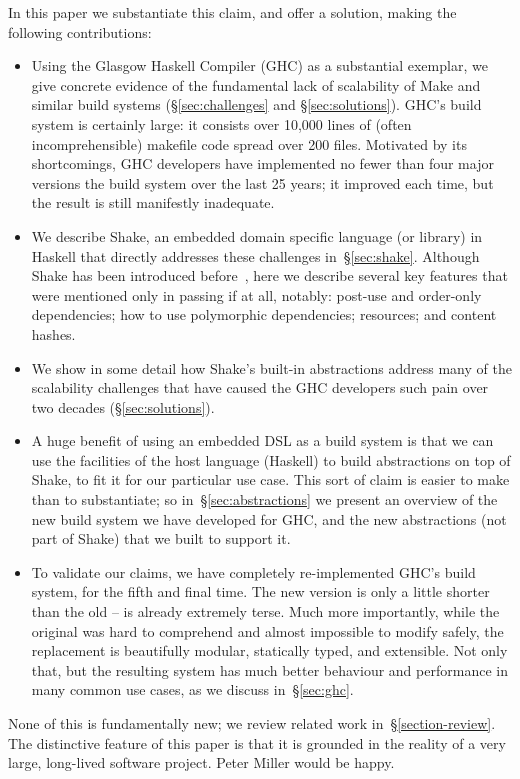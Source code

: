In this paper we substantiate this claim, and offer a solution,
making the following contributions:
\begin{itemize}
\item Using the Glasgow Haskell Compiler (GHC) as a substantial exemplar,
we give concrete evidence of the fundamental lack of scalability of
Make and similar build systems (\S\ref{sec:challenges} and
\S\ref{sec:solutions}).  GHC's build system is certainly large: it
consists over 10,000 lines of (often incomprehensible) makefile code
spread over 200 files.  Motivated by its shortcomings, GHC developers have
implemented no fewer than four major versions the build system over the
last 25 years; it improved each time, but the result is still manifestly inadequate.

\item We describe Shake, an embedded domain specific language (or library)
in Haskell that directly addresses these challenges
in~\S\ref{sec:shake}.
Although Shake has been introduced before~\cite{shake}, here we describe
several key features that were mentioned only in passing if at all, notably:
post-use and order-only dependencies; how to use polymorphic dependencies;
resources; and content hashes.

\item We show in some detail how Shake's built-in abstractions address
many of the scalability challenges that have caused the GHC developers such pain over
two decades (\S\ref{sec:solutions}).

\item A huge benefit of using an embedded DSL as a build system is that
we can use the facilities of the host language (Haskell) to build
abstractions on top of Shake, to fit it for our particular use case.
This sort of claim is easier to make than to substantiate; so
in~\S\ref{sec:abstractions} we present an overview of the new build system we have
developed for GHC, and the new abstractions (not part of Shake) that we built
to support it.

\item To validate our claims, we have completely re-implemented GHC's
build system, for the fifth and final time.  The new version is
only a little shorter than the old -- \make{} is already extremely terse.
Much more importantly, while the original was hard to comprehend and
almost impossible to modify safely, the replacement is beautifully
modular, statically typed, and extensible.  Not only that, but the
resulting system has much better behaviour and performance in many
common use cases, as we discuss in~\S\ref{sec:ghc}.
\end{itemize}
None of this is fundamentally new; we review related work
in~\S\ref{section-review}.
The distinctive feature of this paper is that it is grounded in the reality
of a very large, long-lived software project.  Peter Miller would be happy.

